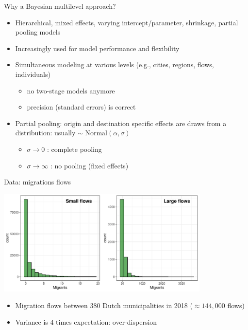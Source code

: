 \documentclass{beamer}
\begin{document}
\begin{frame}{Why a Bayesian multilevel approach?}
\begin{itemize}
	\item Hierarchical, mixed effects, varying intercept/parameter, shrinkage, partial pooling models\pause
	\item Increasingly used for model \alert{performance} and \alert{flexibility} \pause
    \item \alert{Simultaneous} modeling at various levels (e.g., cities, regions, flows, individuals) 
    \begin{itemize}
    	\item no two-stage models anymore 
    	\item precision (standard errors) is correct\pause
    \end{itemize}
	\item \alert{Partial pooling}: origin and destination specific effects are draws from a distribution: usually $\sim \text{ Normal}(\alpha, \sigma)$
	\begin{itemize}
		\item $\sigma \longrightarrow 0$ : complete pooling
		\item $\sigma \longrightarrow \infty$ : no pooling (fixed effects)
	\end{itemize}
\end{itemize}
\end{frame}

\begin{frame}{Data: migrations flows}
	\begin{center}
		\includegraphics[width=0.8\textwidth]{../fig/hist_mig}      
	\end{center}
\begin{itemize}
	\item Migration flows \alert{between} 380 Dutch municipalities in 2018 ($\approx 144,000$ flows)
	\item Variance is 4 times expectation: \alert{over-dispersion}
\end{itemize}
\end{frame}
\end{document}
